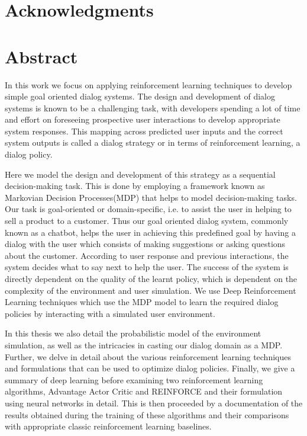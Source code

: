 \documentclass[14pt]{extarticle}
\numberwithin{equation}{section}
\begin{document}
	\section*{Acknowledgments}
	\clearpage
	
	\section*{Abstract}
	In this work we focus on applying reinforcement learning techniques to develop simple goal oriented dialog systems. The design and development of dialog systems is known to be a challenging task, with developers spending a lot of time and effort on foreseeing prospective user interactions to develop appropriate system responses. This mapping across predicted user inputs and the correct system outputs is called a dialog strategy or in terms of reinforcement learning, a dialog policy.
	
	Here we model the design and development of this strategy as a sequential decision-making task. This is done by employing a framework known as Markovian Decision Processes(MDP) that helps to model decision-making tasks. Our task is goal-oriented or domain-specific, i.e. to assist the user in helping to sell a product to a customer. Thus our goal oriented dialog system, commonly known as a chatbot, helps the user in achieving this predefined goal by having a dialog with the user which consists of making suggestions or asking questions about the customer. According to user response and previous interactions, the system decides what to say next to help the user. The success of the system is directly dependent on the quality of the learnt policy, which is dependent on the complexity of the environment and user simulation. We use Deep Reinforcement Learning techniques which use the MDP model to learn the required dialog policies by interacting with a simulated user environment. 
	
	In this thesis we also detail the probabilistic model of the environment simulation, as well as the intricacies in casting our dialog domain as a MDP. Further, we delve in detail about the various reinforcement learning techniques and formulations that can be used to optimize dialog policies. Finally, we give a summary of deep learning before examining two reinforcement learning algorithms, Advantage Actor Critic and REINFORCE and their formulation using neural networks in detail. This is then proceeded by a documentation of the results obtained during the training of these algorithms and their comparisons with appropriate classic reinforcement learning baselines. 
	\clearpage
	\tableofcontents
	
\end{document}
